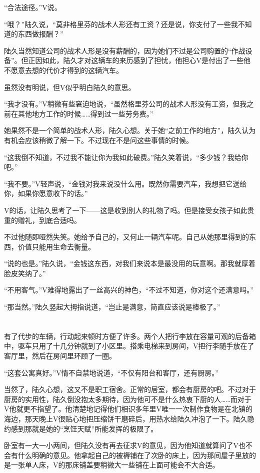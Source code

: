 “合法途径。”V说。

“哦？”陆久说，“莫非格里芬的战术人形还有工资？还是说，你支付了一些我不知道的东西做报酬？”

陆久当然知道公司的战术人形是没有薪酬的，因为她们不过是公司购置的“作战设备”。但正因如此，陆久才对这辆车的来历感到了担忧，他担心V是付出了一些他不愿意去想的代价才得到的这辆汽车。

虽然没有明说，但V似乎明白陆久的意思。

“我才没有。”V稍微有些窘迫地说，“虽然格里芬公司的战术人形没有工资，但我之前在其他地方工作的时候……得到过一些劳务费。”

她果然不是一个简单的战术人形，陆久心想。关于她“之前工作的地方”，陆久认为有机会应该稍微了解一下。不过现在不是问这些事情的时候。

“这我倒不知道，不过我不能让你为我如此破费。”陆久笑着说，“多少钱？我给你吧。”

“我不要。”V轻声说，“金钱对我来说没什么用。既然你需要汽车，我想把它送给你，如果你愿意收下的话。”

V的话，让陆久思考了一下——这是收到别人的礼物了吗。但是接受女孩子如此贵重的赠礼，到底合适吗。

不过他随即哑然失笑。她给予自己的，又何止一辆汽车呢。自己从她那里得到的东西，价值只能用生命去衡量。

“说的也是。”陆久说，“金钱这东西，对我们来说本是最没用的玩意啊。那我就厚着脸皮笑纳了。”

“不用客气。”V难得地露出了一丝高兴的神色，“不过不知道，你对这个还满意吗。”

“那当然。”陆久竖起大拇指说道，“岂止是满意，简直应该说是棒极了。”

\section*{}

有了代步的车辆，行动起来顿时方便了许多。两个人把行李放在容量可观的后备箱中，驱车只用了十几分钟就到了小区里。搭乘电梯来到房间，V把行李随手放在了客厅里，然后在房间里环顾了一圈。

“这套公寓真好。”V情不自禁地说道，“不仅有阳台和客厅，还有厨房。”

当然了，陆久心想，这又不是职工宿舍。正常的居室，都会有厨房的吧。不过对于厨房的实用性，陆久倒没抱太多期待，因为他可不是什么热衷下厨的人……而对于V他就更不指望了。他清楚地记得他们相识多年里V唯一一次制作食物是在北镇的海边，那天晚上V很贴心地把压缩饼干磨碎后，用热水给陆久冲泡了一下。陆久隐约感到那就是她的“烹饪天赋”所能发挥的极限了。

卧室有一大一小两间，但陆久没有再去征求V的意见，因为他知道就算问了V也不会有什么明确的意见。他拿起自己的被褥铺在了次卧的床上，因为那间屋子里放的是一张单人床，V的那床铺盖要稍微大一些铺在上面可能会不大合适。

